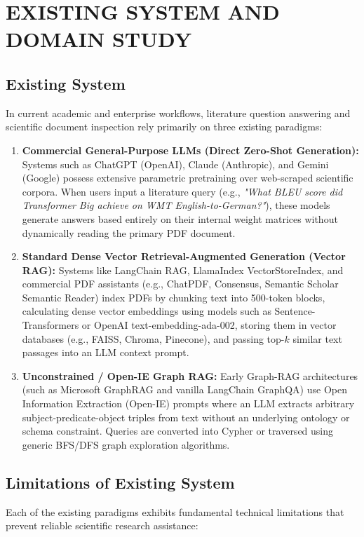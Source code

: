 \chapter{EXISTING SYSTEM AND DOMAIN STUDY}

\section{Existing System}
In current academic and enterprise workflows, literature question answering and scientific document inspection rely primarily on three existing paradigms:
\begin{enumerate}
    \item \textbf{Commercial General-Purpose LLMs (Direct Zero-Shot Generation):} Systems such as ChatGPT (OpenAI), Claude (Anthropic), and Gemini (Google) possess extensive parametric pretraining over web-scraped scientific corpora. When users input a literature query (e.g., \textit{"What BLEU score did Transformer Big achieve on WMT English-to-German?"}), these models generate answers based entirely on their internal weight matrices without dynamically reading the primary PDF document.
    \item \textbf{Standard Dense Vector Retrieval-Augmented Generation (Vector RAG):} Systems like LangChain RAG, LlamaIndex VectorStoreIndex, and commercial PDF assistants (e.g., ChatPDF, Consensus, Semantic Scholar Semantic Reader) index PDFs by chunking text into 500-token blocks, calculating dense vector embeddings using models such as Sentence-Transformers or OpenAI text-embedding-ada-002, storing them in vector databases (e.g., FAISS, Chroma, Pinecone), and passing top-$k$ similar text passages into an LLM context prompt.
    \item \textbf{Unconstrained / Open-IE Graph RAG:} Early Graph-RAG architectures (such as Microsoft GraphRAG and vanilla LangChain GraphQA) use Open Information Extraction (Open-IE) prompts where an LLM extracts arbitrary subject-predicate-object triples from text without an underlying ontology or schema constraint. Queries are converted into Cypher or traversed using generic BFS/DFS graph exploration algorithms.
\end{enumerate}

\section{Limitations of Existing System}
Each of the existing paradigms exhibits fundamental technical limitations that prevent reliable scientific research assistance:


